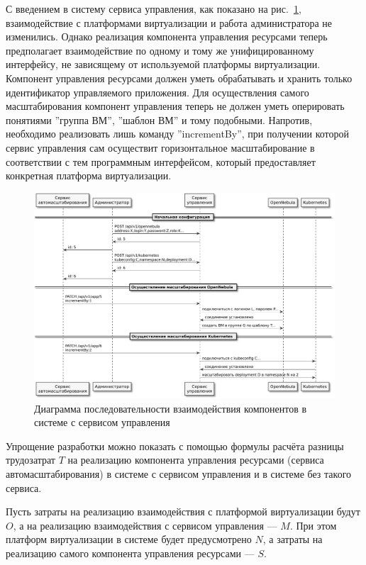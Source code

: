 С введением в систему сервиса управления, как показано на рис.~\ref{result-after}, взаимодействие с платформами виртуализации и работа администратора не изменились.
Однако реализация компонента управления ресурсами теперь предполагает взаимодействие по одному и тому же унифицированному интерфейсу, не зависящему от используемой платформы виртуализации.
Компонент управления ресурсами должен уметь обрабатывать и хранить только идентификатор управляемого приложения.
Для осуществления самого масштабирования компонент управления теперь не должен уметь оперировать понятиями ''группа ВМ'', ''шаблон ВМ'' и тому подобными.
Напротив, необходимо реализовать лишь команду ''incrementBy'', при получении которой сервис управления сам осуществит горизонтальное масштабирование в соответствии с тем программным интерфейсом, который предоставляет конкретная платформа виртуализации.

\begin{figure}[H]
    \centering
    \includegraphics[width=\textwidth]{img/result-after.pdf}
    \caption{Диаграмма последовательности взаимодействия компонентов в системе с сервисом управления}
    \label{result-after}
\end{figure}

Упрощение разработки можно показать с помощью формулы расчёта разницы трудозатрат $T$ на реализацию компонента управления ресурсами (сервиса автомасштабирования) в системе с сервисом управления и в системе без такого сервиса. 

Пусть затраты на реализацию взаимодействия с платформой виртуализации будут $O$, а на реализацию взаимодействия с сервисом управления --- $M$. При этом платформ виртуализации в системе будет предусмотрено $N$, а затраты на реализацию самого компонента управления ресурсами --- $S$.

